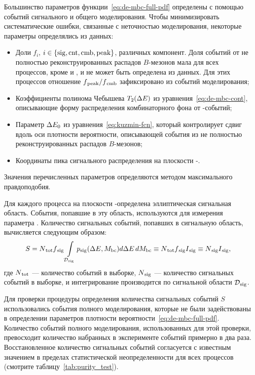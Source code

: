 Большинство параметров функции~\eqref{eq:de-mbc-full-pdf} определены с помощью событий сигнального и общего моделирования.  Чтобы минимизировать систематические ошибки, связанные с неточностью моделирования, некоторые параметры определялись из данных:
\begin{itemize}
 \item Доли $f_i$, $i\in\{\mathrm{sig}, \mathrm{cnt}, \mathrm{cmb}, \mathrm{peak}\}$, различных компонент.  Доля событий от не полностью реконструированных распадов $B$-мезонов мала для всех процессов, кроме \bdpi и \bdstpi, и не может быть определена из данных.  Для этих процессов отношение $f{}_{\mathrm{peak}}/f{}_{\mathrm{cmb}}$ зафиксировано из событий моделирования;
 \item Коэффициенты полинома Чебышева $T_2(\Delta E)$ из уравнения~\eqref{eq:de-mbc-cont},  описывающие форму \de распределения комбинаторного фона от \qqbar-событий;
 \item Параметр $\Delta E_0$ из уравнения~\eqref{eq:kuzmin-fcn}, который контролирует сдвиг вдоль оси \de плотности вероятности, описывающей события из не полностью реконструированных распадов $B$-мезонов;
 \item Координаты пика сигнального распределения на плоскости \de-\mbc.
\end{itemize}
Значения перечисленных параметров определяются методом максимального правдоподобия.

Для каждого процесса на плоскости \de-\mbc определена эллиптическая сигнальная область.  События, попавшие в эту область, используются для измерения параметра \pphi.  Количество сигнальных событий, попавших в сигнальную область, вычисляется следующим образом:
\begin{equation*}
 S = N{}_{\mathrm{tot}}f{}_{\mathrm{sig}}\int\limits_{\mathcal{D}{}_{\mathrm{sig}}}p{}_{\mathrm{sig}}(\Delta E,M_{\mathrm{bc}})d\Delta E\,dM_{\mathrm{bc}}\equiv N{}_{\mathrm{tot}}f{}_{\mathrm{sig}}I{}_{\mathrm{sig}}\equiv N{}_{\mathrm{sig}}I{}_{\mathrm{sig}},
\end{equation*}
где $N{}_{\mathrm{tot}}$ --- количество событий в выборке, $N{}_{\mathrm{sig}}$ --- количество сигнальных событий в выборке, и интегрирование производится по сигнальной области $\mathcal{D}{}_{\mathrm{sig}}$.


Для проверки процедуры определения количества сигнальных событий $S$ использовались события полного моделирования, которые не были задействованы в определении параметров плотности вероятности~\eqref{eq:de-mbc-full-pdf}.  Количество событий полного моделирования, использованных для этой проверки, превосходит количество набранных в эксперименте событий примерно в два раза.  Восстановленное количество сигнальных событий согласуется с известным значением в пределах статистической неопределенности для всех процессов (смотрите таблицу~\ref{tab:purity_test}).

